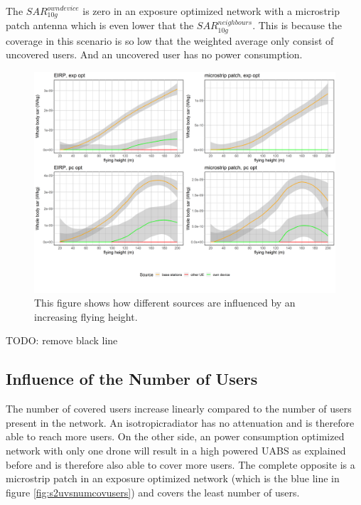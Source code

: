 The $SAR^{own device}_{10g}$ is zero in an exposure optimized network with a microstrip patch antenna which is even lower that the $SAR^{neighbours}_{10g}$.
This is because the coverage in this scenario is so low that the weighted average only consist of uncovered users. And an uncovered user has no power consumption.
\begin{figure}[h!]
  \includegraphics[width=\textwidth]{../results/s2/fhFourSources.png}
  \caption{This figure shows how different sources are influenced by an increasing flying height.}
  \label{fig:s2shfourSourcesMatrix}
\end{figure}

TODO: remove black line


\FloatBarrier
\subsection{Influence of the Number of Users}
\label{s2b}

The number of covered users increase linearly compared to the number of users present in the network.
An \gls{isotropicradiator} has no attenuation and is therefore able to reach more users. On the other side, an power consumption 
optimized network with only one drone will result in a high powered \gls{UABS} as explained before and is therefore also able to 
cover more users. The complete opposite is a microstrip patch in an exposure optimized network (which is the blue line in figure \ref{fig:s2uvsnumcovusers})
and covers the least number of users.

